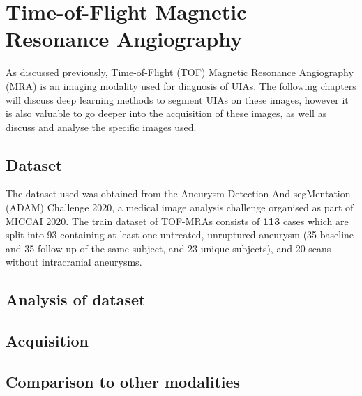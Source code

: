 \chapter{Time-of-Flight Magnetic Resonance Angiography}
As discussed previously, Time-of-Flight (TOF) Magnetic Resonance Angiography (MRA) is an imaging modality used for diagnosis of UIAs. The following chapters will discuss deep learning methods to segment UIAs on these images, however it is also valuable to go deeper into the acquisition of these images, as well as discuss and analyse the specific images used.

\section{Dataset}
The dataset used was obtained from the Aneurysm Detection And segMentation (ADAM) Challenge 2020, a medical image analysis challenge organised as part of MICCAI 2020. The train dataset of TOF-MRAs consists of \textbf{113} cases which are split into 93 containing at least one untreated, unruptured aneurysm (35 baseline and 35 follow-up of the same subject, and 23 unique subjects), and 20 scans without intracranial aneurysms.   

\section{Analysis of dataset}

\section{Acquisition}



\section{Comparison to other modalities}

